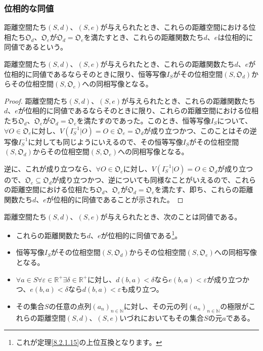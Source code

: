 \documentclass[dvipdfmx]{jsarticle}
\begin{document}
\subsubsection{位相的な同値}%
\begin{dfn}
距離空間たち$(S,d)$、$(S,e)$が与えられたとき、これらの距離空間における位相たち$\mathfrak{O}_{d}$、$\mathfrak{O}_{e}$が$\mathfrak{O}_{d} = \mathfrak{O}_{e}$を満たすとき、これらの距離関数たち$d$、$e$は位相的に同値であるという。
\end{dfn}
\begin{thm}\label{8.2.1.15}
距離空間たち$(S,d)$、$(S,e)$が与えられたとき、これらの距離関数たち$d$、$e$が位相的に同値であるならそのときに限り、恒等写像$I_{S}$がその位相空間$\left( S,\mathfrak{O}_{d} \right)$からその位相空間$\left( S,\mathfrak{O}_{e} \right)$への同相写像となる。
\end{thm}
\begin{proof}
距離空間たち$(S,d)$、$(S,e)$が与えられたとき、これらの距離関数たち$d$、$e$が位相的に同値であるならそのときに限り、これらの距離空間における位相たち$\mathfrak{O}_{d}$、$\mathfrak{O}_{e}$が$\mathfrak{O}_{d} = \mathfrak{O}_{e}$を満たすのであった。このとき、恒等写像$I_{S}$について、$\forall O \in \mathfrak{O}_{e}$に対し、$V\left( I_{S}^{- 1}|O \right) = O \in \mathfrak{O}_{e} = \mathfrak{O}_{d}$が成り立つかつ、このことはその逆写像$I_{S}^{- 1}$に対しても同じようにいえるので、その恒等写像$I_{S}$がその位相空間$\left( S,\mathfrak{O}_{d} \right)$からその位相空間$\left( S,\mathfrak{O}_{e} \right)$への同相写像となる。\par
逆に、これが成り立つなら、$\forall O \in \mathfrak{O}_{e}$に対し、$V\left( I_{S}^{- 1}|O \right) = O \in \mathfrak{O}_{d}$が成り立つので、$\mathfrak{O}_{e} \subseteq \mathfrak{O}_{d}$が成り立つかつ、逆についても同様なことがいえるので、これらの距離空間における位相たち$\mathfrak{O}_{d}$、$\mathfrak{O}_{e}$が$\mathfrak{O}_{d} = \mathfrak{O}_{e}$を満たす、即ち、これらの距離関数たち$d$、$e$が位相的に同値であることが示された。
\end{proof}
\begin{thm}\label{8.2.1.16}
距離空間たち$(S,d)$、$(S,e)$が与えられたとき、次のことは同値である。
\begin{itemize}
\item
  これらの距離関数たち$d$、$e$が位相的に同値である\footnote{これが定理\ref{8.2.1.15}の上位互換となります。}。
\item
  恒等写像$I_{S}$がその位相空間$\left( S,\mathfrak{O}_{d} \right)$からその位相空間$\left( S,\mathfrak{O}_{e} \right)$への同相写像となる。
\item
  $\forall a \in S\forall\varepsilon \in \mathbb{R}^{+}\exists\delta \in \mathbb{R}^{+}$に対し、$d(b,a) < \delta$なら$e(b,a) < \varepsilon$が成り立つかつ、$e(b,a) < \delta$なら$d(b,a) < \varepsilon$も成り立つ。
\item
  その集合$S$の任意の点列$\left( a_{n} \right)_{n \in \mathbb{N}}$に対し、その元の列$\left( a_{n} \right)_{n \in \mathbb{N}}$の極限がこれらの距離空間$(S,d)$、$(S,e)$いづれにおいてもその集合$S$の元$a$である。
\end{itemize}
\end{thm}
\end{document}
